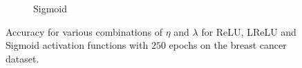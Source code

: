 \documentclass[%
reprint,
amsmath,amssymb,
aps,
]{revtex4-2}
\begin{document}
\begin{figure}[ht!]
\begin{subfigure}{0.4353\textwidth}
		\caption{Sigmoid}
		\label{fig:Sigmoid_heatmap}
	\end{subfigure}
	\caption{Accuracy for various combinations of $\eta$ and $\lambda$ for ReLU, LReLU and Sigmoid activation functions with $250$ epochs on the breast cancer dataset.}
	\label{fig:FFNN_cancer_heatmaps}
\end{figure}

	
\end{document}
